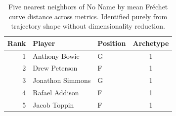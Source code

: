 \begin{table}[htbp]
  \centering\small
  \begin{tabular}{rllc}
    \toprule
    Rank & Player & Position & Archetype \\
    \midrule
    1 & Anthony Bowie & G & 1 \\
    2 & Drew Peterson & F & 1 \\
    3 & Jonathon Simmons & G & 1 \\
    4 & Rafael Addison & F & 1 \\
    5 & Jacob Toppin & F & 1 \\
    \bottomrule
  \end{tabular}
  \caption{Five nearest neighbors of No Name by mean Fr\'{e}chet curve distance across metrics. Identified purely from trajectory shape without dimensionality reduction.}
\end{table}

